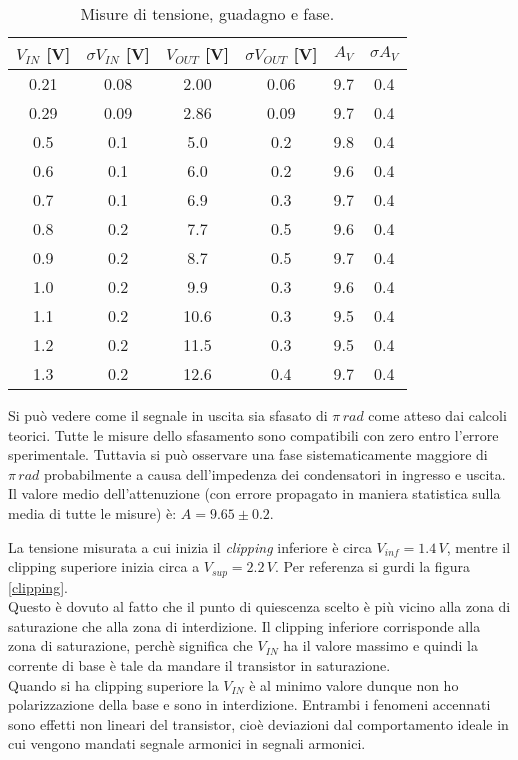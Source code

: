 \documentclass[10pt,a4paper]{article}
\begin{document}
\begin{table}[!hbt]
\centering
\begin{tabular}{|c|c|c|c|c|c|}
\hline 
$V_{IN}$ [V] & $\sigma V_{IN}$ [V] & $V_{OUT}$ [V]& $\sigma V_{OUT}$ [V] & $A_V$ & $\sigma A_V$ \\ 
\hline
0.21 & 0.08 & 2.00 & 0.06 & 9.7 & 0.4\\
0.29 & 0.09 & 2.86 & 0.09 & 9.7 & 0.4\\
0.5 & 0.1 & 5.0 & 0.2 & 9.8 & 0.4\\
0.6 & 0.1 & 6.0 & 0.2 & 9.6 & 0.4\\
0.7 & 0.1 & 6.9 & 0.3 & 9.7 & 0.4\\
0.8 & 0.2 & 7.7 & 0.5 & 9.6 & 0.4\\
0.9 & 0.2 & 8.7 & 0.5 & 9.7 & 0.4\\
1.0 & 0.2 & 9.9 & 0.3 & 9.6 & 0.4\\
1.1 & 0.2 & 10.6 & 0.3 & 9.5 & 0.4\\
1.2 & 0.2 & 11.5 & 0.3 & 9.5 & 0.4\\
1.3 & 0.2 & 12.6 & 0.4 & 9.7 & 0.4\\
\hline
\end{tabular}
\caption{Misure di tensione, guadagno e fase.} \label{ampiezza}
\end{table}


Si può vedere come il segnale in uscita sia sfasato di $\pi \, rad$ come atteso dai calcoli teorici. Tutte le misure dello sfasamento sono compatibili con zero entro l'errore sperimentale. Tuttavia si può osservare una fase sistematicamente maggiore di $\pi \, rad$ probabilmente a causa dell'impedenza dei condensatori in ingresso e uscita. Il valore medio dell'attenuzione (con errore propagato in maniera statistica sulla media di tutte le misure) è: $A = 9.65 \pm 0.2$.

La tensione misurata a cui inizia il \emph{clipping} inferiore è circa $V_{inf} = 1.4 \,V$, mentre il clipping superiore inizia circa a $V_{sup} = 2.2 \, V$. Per referenza si gurdi la figura \ref{clipping}.\\
Questo è dovuto al fatto che il punto di quiescenza scelto è più vicino alla zona di saturazione che alla zona di interdizione. Il clipping inferiore corrisponde alla zona di saturazione, perchè significa che $V_{IN}$ ha il valore massimo e quindi la corrente di base è tale da mandare il transistor in saturazione.\\
Quando si ha clipping superiore la $V_{IN}$ è al minimo valore dunque non ho polarizzazione della base e sono in interdizione.
Entrambi i fenomeni accennati sono effetti non lineari del transistor, cioè deviazioni dal comportamento ideale in cui vengono mandati segnale armonici in segnali armonici.\\
\end{document}
